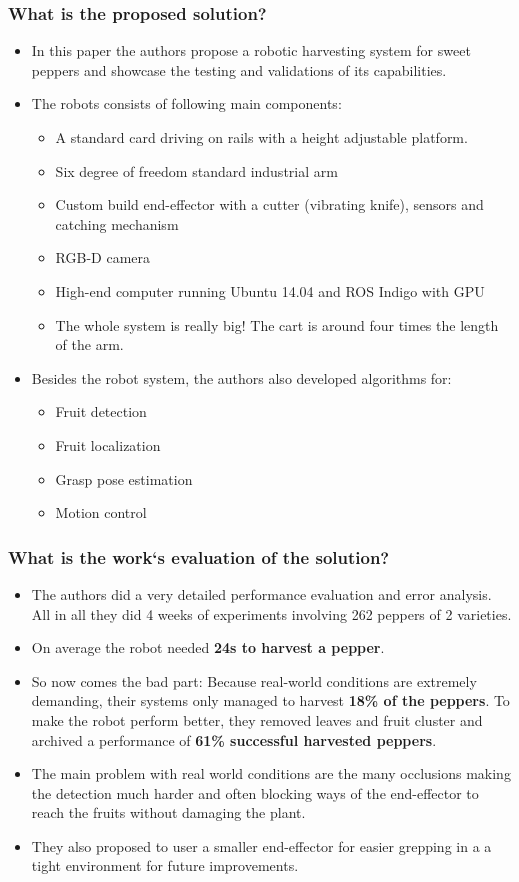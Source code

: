\subsubsection*{What is the proposed solution?}
\begin{itemize}
    \item In this paper the authors propose a robotic harvesting system for sweet peppers and showcase the testing and validations of its capabilities.
    \item The robots consists of following main components: \begin{itemize}
        \item A standard card driving on rails with a height adjustable platform. 
        \item Six degree of freedom standard industrial arm
        \item Custom build end-effector with a cutter (vibrating knife), sensors and catching mechanism
        \item RGB-D camera 
        \item High-end computer running Ubuntu 14.04 and ROS Indigo with GPU
        \item The whole system is really big! The cart is around four times the length of the arm.
    \end{itemize}
    \item Besides the robot system, the authors also developed algorithms for: \begin{itemize}
        \item Fruit detection
        \item Fruit localization
        \item Grasp pose estimation
        \item Motion control
    \end{itemize}
\end{itemize}
\subsubsection*{What is the work`s evaluation of the solution?}
\begin{itemize}
    \item The authors did a very detailed performance evaluation and error analysis. All in all they did 4 weeks of experiments involving 262 peppers of 2 varieties.
    \item On average the robot needed \textbf{24s to harvest a pepper}.
    \item So now comes the bad part: Because real-world conditions are extremely demanding, their systems only managed to
    harvest \textbf{18\% of the peppers}. To make the robot perform better, they removed leaves and fruit cluster and archived 
    a performance of \textbf{61\% successful harvested peppers}.
    \item The main problem with real world conditions are the many occlusions making the detection much harder and often 
    blocking ways of the end-effector to reach the fruits without damaging the plant.
    \item They also proposed to user a smaller end-effector for easier grepping in a a tight environment for future improvements.
\end{itemize}

